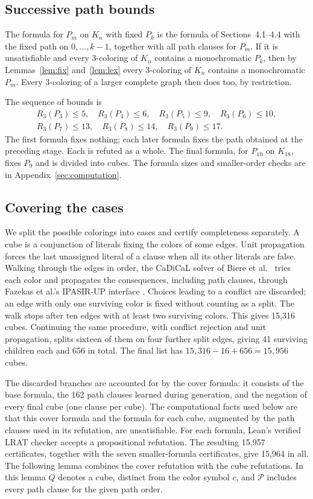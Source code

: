 \documentclass[11pt]{article}
\theoremstyle{definition}
\theoremstyle{remark}
\newcommand{\R}{R_3}
\begin{document}
\subsection{Successive path bounds}\label{sec:ladder}
The formula for $P_m$ on $K_n$ with fixed $P_k$ is the formula of Sections~4.1--4.4 with the fixed path on $0,\dots,k-1$, together
with all path clauses for $P_m$. If it is unsatisfiable and every
$3$-coloring of $K_n$ contains a monochromatic $P_k$, then by
Lemmas~\ref{lem:fix} and~\ref{lem:lex} every $3$-coloring of $K_n$
contains a monochromatic $P_m$. Every $3$-coloring of a larger complete
graph then does too, by restriction.

The sequence of bounds is
\begin{gather*}
\R(P_3)\le5,\quad \R(P_4)\le6,\quad \R(P_5)\le9,\quad
\R(P_6)\le10,\\
\R(P_7)\le13,\quad \R(P_8)\le14,\quad \R(P_9)\le17.
\end{gather*}
The first formula fixes nothing; each later formula fixes the path
obtained at the preceding stage. Each is refuted as a whole. The final
formula, for $P_{10}$ on $K_{18}$, fixes $P_9$ and is divided into cubes.
The formula sizes and smaller-order checks are in
Appendix~\ref{sec:computation}.

\subsection{Covering the cases}\label{sec:cnc}
We split the possible colorings into cases and certify completeness
separately. A cube is a conjunction of literals fixing the colors of some edges.
Unit propagation forces the last unassigned literal of a clause when
all its other literals are false. Walking through the edges in order, the
CaDiCaL solver of Biere et al.\ \cite{BFF+24} tries each color and
propagates the consequences, including path clauses, through Fazekas et
al.'s IPASIR-UP interface \cite{FNP+23,FNP+24}. Choices leading to a conflict are discarded; an edge with only
one surviving color is fixed without counting as a split. The walk stops
after ten edges with at least two surviving colors. This gives 15,316
cubes. Continuing the same procedure, with conflict rejection and unit
propagation, splits sixteen of them on four further split edges, giving
41 surviving children each and 656 in total. The final list has $15{,}316-16+656=15{,}956$ cubes.

The discarded branches are accounted for by the cover formula: it
consists of the base formula, the 162 path clauses learned during
generation, and the negation of every final cube (one clause per cube).
The computational facts used below are that this cover formula and the
formula for each cube, augmented by the path clauses used in its
refutation, are unsatisfiable. For each formula, Lean's verified LRAT
checker accepts a propositional refutation. The resulting 15,957 certificates, together
with the seven smaller-formula certificates, give 15,964 in all.
The following lemma combines the cover refutation with the cube
refutations. In this lemma $Q$ denotes a cube, distinct from the color
symbol $c$, and $\mathcal P$ includes
every path clause for the given path order.
\end{document}
